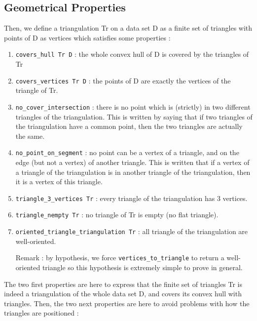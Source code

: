 \documentclass[a4paper,10pt]{article}
\begin{document}
\subsection{Geometrical Properties}
\label{definition_triangulation}
Then, we define a triangulation Tr on a data set D as a finite set of triangles with points of D as vertices which satisfies some properties :
\begin{enumerate}
\item {\tt covers\_hull Tr D} : the whole convex hull of D is covered by the triangles of Tr
\item {\tt covers\_vertices Tr D} : the points of D are exactly the vertices of the triangle of Tr.
\item {\tt no\_cover\_intersection} : there is no point which is (strictly) in two different triangles of the triangulation. This is written by saying that if two triangles of the triangulation have a common point, then the two triangles are actually the same.
  \item{\tt no\_point\_on\_segment} : no point can be a vertex of a triangle, and on the edge (but not a vertex) of another triangle. This is written that if a vertex of a triangle of the triangulation is in another triangle of the triangulation, then it is a vertex of this triangle.
\item {\tt triangle\_3\_vertices Tr} : every triangle of the triangulation has 3 vertices.
\item {\tt triangle\_nempty Tr} : no triangle of Tr is empty (no flat triangle).
\item {\tt oriented\_triangle\_triangulation Tr} : all triangle of the triangulation are well-oriented.

  Remark : by hypothesis, we force {\tt vertices\_to\_triangle} to return a well-oriented triangle so this hypothesis is extremely simple to prove in general.
\end{enumerate}
The two first properties are here to express that the finite set of triangles Tr is indeed a triangulation of the whole data set D, and covers its convex hull with triangles.
Then, the two next properties are here to avoid problems with how the triangles are positioned : 
\end{document}

